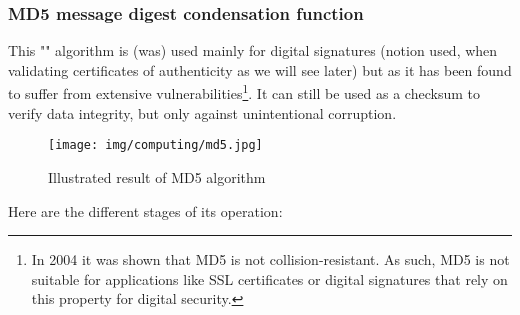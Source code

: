 	\subsubsection{MD5 message digest condensation function}\label{md5}
	This "" algorithm is (was) used mainly for digital signatures (notion used, when validating certificates of authenticity as we will see later) but as it has been found to suffer from extensive vulnerabilities\footnote{In 2004 it was shown that MD5 is not collision-resistant. As such, MD5 is not suitable for applications like SSL certificates or digital signatures that rely on this property for digital security.}. It can still be used as a checksum to verify data integrity, but only against unintentional corruption.
	\begin{figure}[H]
		\centering
		\texttt{[image: img/computing/md5.jpg]}
		\caption{Illustrated result of MD5 algorithm}
	\end{figure}
	Here are the different stages of its operation:
